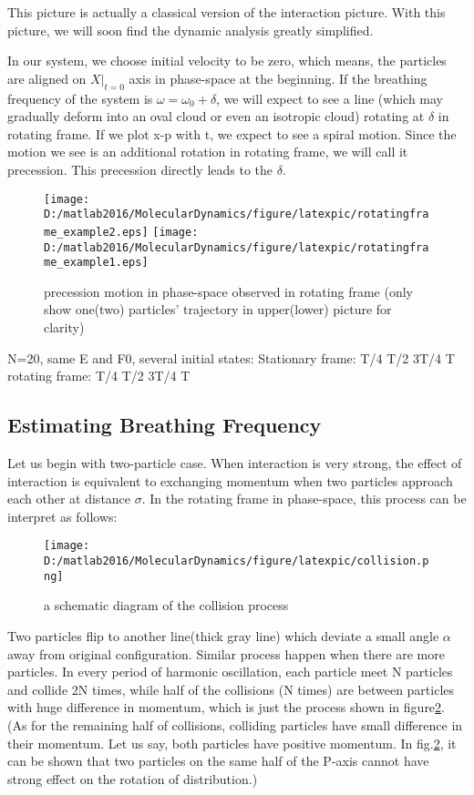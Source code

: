 \documentclass[aps,pre,twocolumn
,groupedaddress]{revtex4-1}
\begin{document}
This picture is actually a classical version of the interaction picture. With this picture, we will soon find the dynamic analysis greatly simplified.

In our system, we choose initial velocity to be zero, which means, the particles are aligned on $X|_{t=0}$ axis in phase-space at the beginning. If the breathing frequency of the system is $\omega=\omega_0+\delta$, we will expect to see a line (which may gradually deform into an oval cloud or even an isotropic cloud) rotating at $\delta$ in rotating frame. If we plot x-p with t, we expect to see a spiral motion. Since the motion we see is an additional rotation in rotating frame, we will call it precession. This precession directly leads to the $\delta$.


\begin{figure}[hbtp]
\centering
\texttt{[image: D:/matlab2016/MolecularDynamics/figure/latexpic/rotatingframe\_example2.eps]} 
\texttt{[image: D:/matlab2016/MolecularDynamics/figure/latexpic/rotatingframe\_example1.eps]} 
\caption{precession motion in phase-space observed in rotating frame (only show one(two) particles' trajectory in upper(lower) picture for clarity)}
\label{Breathingfrequency2}
\end{figure}


{\color{red}{ONE SET OF PICTURES HERE TO SHOW THE TIME EVOLUTION OF THE CLOUD IN PHASE-SPACE:}}
N=20, same E and F0, several initial states:
Stationary frame: T/4 T/2 3T/4 T
rotating frame: T/4 T/2 3T/4 T



\subsection{Estimating Breathing Frequency}
Let us begin with two-particle case. When interaction is very strong, the effect of interaction is equivalent to exchanging momentum when two particles approach each other at distance $\sigma$. In the rotating frame in phase-space, this process can be interpret as follows:

\begin{figure}[hbtp]
\centering
\texttt{[image: D:/matlab2016/MolecularDynamics/figure/latexpic/collision.png]}
\caption{a schematic diagram of the collision process}
\label{Breathingfrequency3}
\end{figure}


Two particles flip to another line(thick gray line) which deviate a small angle $\alpha$ away from original configuration. Similar process happen when there are more particles. In every period of harmonic oscillation, each particle meet N particles and collide 2N times, while half of the collisions (N times) are between particles with huge difference in momentum, which is just the process shown in figure\ref{Breathingfrequency3}. (As for the remaining half of collisions, colliding particles have small difference in their momentum. Let us say, both particles have positive momentum. In fig.\ref{Breathingfrequency3}, it can be shown that two particles on the same half of the P-axis cannot have strong effect on the rotation of distribution.)
\end{document}
